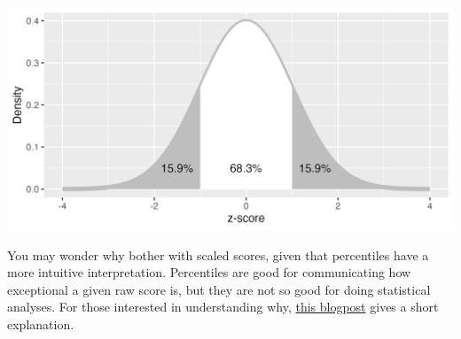 \begin{tcolorbox}[enhanced, breakable,colback=Black!5!lightgray,colframe=black!75!black,coltitle=white,title=How scaled scores are derived]
\includegraphics[width=0.75\linewidth]{images_bw/zDensityCDF} \label{zDensityCDF}
  
  
You may wonder why bother with scaled scores, given that percentiles have a more intuitive interpretation. Percentiles are good for communicating how exceptional a given raw score is, but they are not so good for doing statistical analyses. For those interested in understanding why, \href{http://deevybee.blogspot.com/2011/04/short-nerdy-post-about-use-of.html}{this blogpost} gives a short explanation.
\end{tcolorbox}
